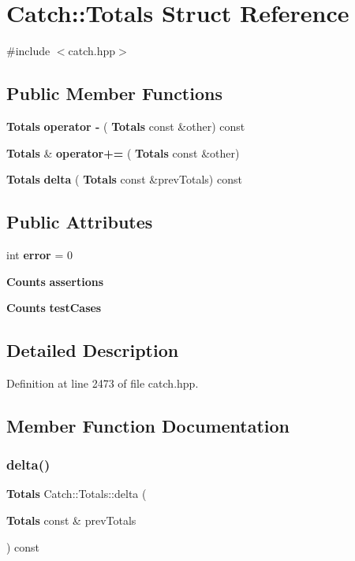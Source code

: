 \section{Catch\+::Totals Struct Reference}
\label{struct_catch_1_1_totals}


{\ttfamily \#include $<$catch.\+hpp$>$}

\subsection*{Public Member Functions}
\begin{DoxyCompactItemize}
\item 
\textbf{ Totals} \textbf{ operator -\/} (\textbf{ Totals} const \&other) const
\item 
\textbf{ Totals} \& \textbf{ operator+=} (\textbf{ Totals} const \&other)
\item 
\textbf{ Totals} \textbf{ delta} (\textbf{ Totals} const \&prev\+Totals) const
\end{DoxyCompactItemize}
\subsection*{Public Attributes}
\begin{DoxyCompactItemize}
\item 
int \textbf{ error} = 0
\item 
\textbf{ Counts} \textbf{ assertions}
\item 
\textbf{ Counts} \textbf{ test\+Cases}
\end{DoxyCompactItemize}


\subsection{Detailed Description}


Definition at line 2473 of file catch.\+hpp.



\subsection{Member Function Documentation}
\mbox{\label{struct_catch_1_1_totals_a1a94a654f5f3786b75695e081fc9bca2}} 
\subsubsection{delta()}
{\footnotesize\ttfamily \textbf{ Totals} Catch\+::\+Totals\+::delta (\begin{DoxyParamCaption}\item[{\textbf{ Totals} const \&}]{prev\+Totals }\end{DoxyParamCaption}) const}

